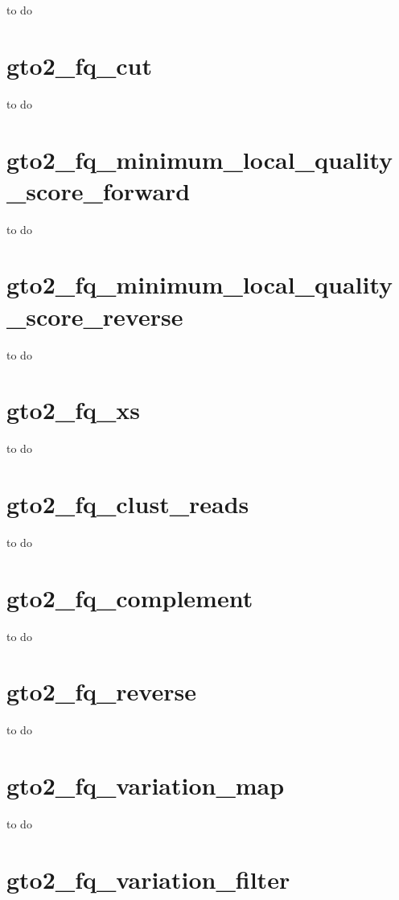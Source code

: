 \documentclass[11pt,]{krantz}
\begin{document}
to do

\section{gto2\_fq\_cut}\label{gto2_fq_cut}

to do

\section{gto2\_fq\_minimum\_local\_quality\_score\_forward}\label{gto2_fq_minimum_local_quality_score_forward}

to do

\section{gto2\_fq\_minimum\_local\_quality\_score\_reverse}\label{gto2_fq_minimum_local_quality_score_reverse}

to do

\section{gto2\_fq\_xs}\label{gto2_fq_xs}

to do

\section{gto2\_fq\_clust\_reads}\label{gto2_fq_clust_reads}

to do

\section{gto2\_fq\_complement}\label{gto2_fq_complement}

to do

\section{gto2\_fq\_reverse}\label{gto2_fq_reverse}

to do

\section{gto2\_fq\_variation\_map}\label{gto2_fq_variation_map}

to do

\section{gto2\_fq\_variation\_filter}\label{gto2_fq_variation_filter}
\end{document}
